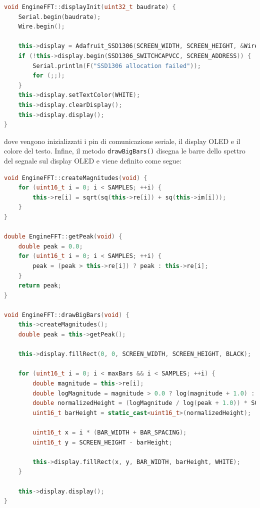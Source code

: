 \documentclass[a4paper,12pt]{report}  %
\newcommand{\lstinlinebg}[1]{\colorbox{backcolour}{\lstinline|#1|}}
\begin{document}
\begin{lstlisting}[language=C++, keywords={void, if, uint32_t, Serial, begin, Wire, Adafruit_SSD1306, SSD1306_SWITCHCAPVCC, clearDisplay, this, setTextColor, for, println}]
void EngineFFT::displayInit(uint32_t baudrate) {
    Serial.begin(baudrate);
    Wire.begin();
    
    this->display = Adafruit_SSD1306(SCREEN_WIDTH, SCREEN_HEIGHT, &Wire, OLED_RESET);
    if (!this->display.begin(SSD1306_SWITCHCAPVCC, SCREEN_ADDRESS)) {
        Serial.println(F("SSD1306 allocation failed"));
        for (;;);
    }
    this->display.setTextColor(WHITE);
    this->display.clearDisplay();
    this->display.display();
}
\end{lstlisting}

dove vengono inizializzati i pin di comunicazione seriale, il display OLED e il colore del testo.
Infine, il metodo \lstinlinebg{drawBigBars()} disegna le barre dello spettro del segnale sul display OLED e viene definito come segue:

\begin{lstlisting}[language=C++, keywords={void, uint8_t, uint16, for, uint16_t, this, sqrt, sq, double, return, fillRect, log, static_cast}]
void EngineFFT::createMagnitudes(void) {
    for (uint16_t i = 0; i < SAMPLES; ++i) {
        this->re[i] = sqrt(sq(this->re[i]) + sq(this->im[i]));
    }
}

double EngineFFT::getPeak(void) {
    double peak = 0.0;
    for (uint16_t i = 0; i < SAMPLES; ++i) {
        peak = (peak > this->re[i]) ? peak : this->re[i];
    }
    return peak;
}

void EngineFFT::drawBigBars(void) {
    this->createMagnitudes();
    double peak = this->getPeak();
        
    this->display.fillRect(0, 0, SCREEN_WIDTH, SCREEN_HEIGHT, BLACK);
    
    for (uint16_t i = 0; i < maxBars && i < SAMPLES; ++i) {
        double magnitude = this->re[i];
        double logMagnitude = magnitude > 0.0 ? log(magnitude + 1.0) : 0.0;
        double normalizedHeight = (logMagnitude / log(peak + 1.0)) * SCREEN_HEIGHT;
        uint16_t barHeight = static_cast<uint16_t>(normalizedHeight);
    
        uint16_t x = i * (BAR_WIDTH + BAR_SPACING);
        uint16_t y = SCREEN_HEIGHT - barHeight;
    
        this->display.fillRect(x, y, BAR_WIDTH, barHeight, WHITE);
    }
    
    this->display.display();
}
\end{lstlisting}
\end{document}
